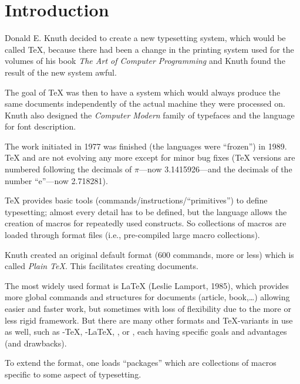 
\chapter{Introduction}

Donald E. Knuth decided to create a new typesetting system, which would be called {\TeX}, because there had been a change in the printing system used for the volumes of his book \emph{The Art of Computer Programming} and Knuth found the result of the new system awful.

The goal of {\TeX} was then to have a system which would always produce the same documents independently of the actual machine they were processed on. Knuth also designed the \emph{Computer Modern} family of typefaces and the \METAFONT{} language for font description.

The work initiated in 1977 was finished (the languages were  ``frozen'') in 1989. {\TeX} and {\METAFONT} are not evolving any more except for minor bug fixes ({\TeX} versions are numbered following the decimals of $\pi$---now 3.1415926---and {\METAFONT} the decimals of the number ``e''---now 2.718281).

{\TeX} provides basic tools (commands/instructions/``primitives'') to define typesetting; almost every detail has to be defined, but the language allows the creation of macros for repeatedly used constructs. So collections of macros are loaded through format files (i.e., pre-compiled large macro collections).

Knuth created an original default format (600 commands, more or less) which is called \emph{Plain \TeX{}}. This facilitates creating documents.

The most widely used format is \LaTeX{} (Leslie Lamport, 1985), which provides more global commands and structures for documents (article, book,\dots) allowing easier and faster work, but sometimes with loss of flexibility due to the more or less rigid framework. But there are many other formats and {\TeX}-variants in use as well, such as \AmS-\TeX{}, \AmS-\LaTeX, \ConTeXt{}, or \XeTeX, each having specific goals and advantages (and drawbacks).

To extend the format, one loads ``packages'' which are collections of macros specific to some aspect of typesetting.

